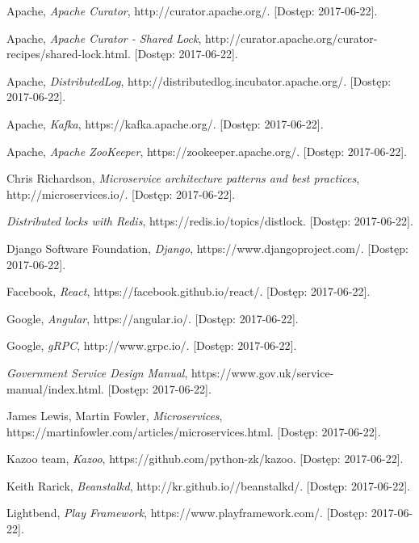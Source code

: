\documentclass[licencjacka]{pracamgr}
\begin{document}
\begin{thebibliography}{99}

 Apache, \textit{Apache Curator},
http://curator.apache.org/. [Dostęp: 2017-06-22].

 Apache, \textit{Apache Curator - Shared Lock},
http://curator.apache.org/curator-recipes/shared-lock.html. [Dostęp: 2017-06-22].

 Apache, \textit{DistributedLog},
http://distributedlog.incubator.apache.org/. [Dostęp: 2017-06-22].

 Apache, \textit{Kafka},
https://kafka.apache.org/. [Dostęp: 2017-06-22].

 Apache, \textit{Apache ZooKeeper},
https://zookeeper.apache.org/. [Dostęp: 2017-06-22].

 Chris Richardson, \textit{Microservice architecture patterns and best practices},
http://microservices.io/. [Dostęp: 2017-06-22].

 \textit{Distributed locks with Redis},
https://redis.io/topics/distlock. [Dostęp: 2017-06-22].

 Django Software Foundation, \textit{Django},
https://www.djangoproject.com/. [Dostęp: 2017-06-22].

 Facebook, \textit{React},
https://facebook.github.io/react/. [Dostęp: 2017-06-22].

 Google, \textit{Angular},
https://angular.io/. [Dostęp: 2017-06-22].

 Google, \textit{gRPC},
http://www.grpc.io/. [Dostęp: 2017-06-22].

 \textit{Government Service Design Manual},
https://www.gov.uk/service-manual/index.html. [Dostęp: 2017-06-22].

 James Lewis, Martin Fowler, \textit{Microservices},
https://martinfowler.com/articles/microservices.html. [Dostęp: 2017-06-22].

 Kazoo team, \textit{Kazoo},
https://github.com/python-zk/kazoo. [Dostęp: 2017-06-22].

 Keith Rarick, \textit{Beanstalkd},
http://kr.github.io//beanstalkd/. [Dostęp: 2017-06-22].

 Lightbend, \textit{Play Framework},
https://www.playframework.com/. [Dostęp: 2017-06-22].


\end{thebibliography}
\end{document}

